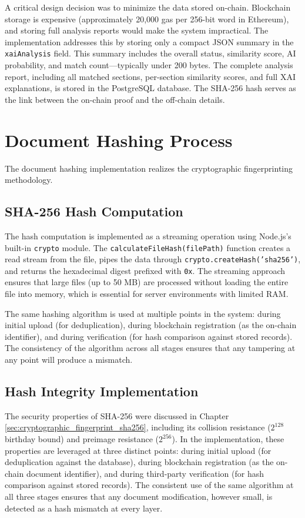 A critical design decision was to minimize the data stored on-chain. Blockchain storage is expensive (approximately 20,000 gas per 256-bit word in Ethereum), and storing full analysis reports would make the system impractical. The implementation addresses this by storing only a compact JSON summary in the \texttt{xaiAnalysis} field. This summary includes the overall status, similarity score, AI probability, and match count---typically under 200 bytes. The complete analysis report, including all matched sections, per-section similarity scores, and full XAI explanations, is stored in the PostgreSQL database. The SHA-256 hash serves as the link between the on-chain proof and the off-chain details.

\section{Document Hashing Process}

The document hashing implementation realizes the cryptographic fingerprinting methodology.

\subsection{SHA-256 Hash Computation}

The hash computation is implemented as a streaming operation using Node.js's built-in \texttt{crypto} module. The \texttt{calculateFileHash(filePath)} function creates a read stream from the file, pipes the data through \texttt{crypto.createHash('sha256')}, and returns the hexadecimal digest prefixed with \texttt{0x}. The streaming approach ensures that large files (up to 50 MB) are processed without loading the entire file into memory, which is essential for server environments with limited RAM.

The same hashing algorithm is used at multiple points in the system: during initial upload (for deduplication), during blockchain registration (as the on-chain identifier), and during verification (for hash comparison against stored records). The consistency of the algorithm across all stages ensures that any tampering at any point will produce a mismatch.

\subsection{Hash Integrity Implementation}

The security properties of SHA-256 were discussed in Chapter \ref{sec:cryptographic_fingerprint_sha256}, including its collision resistance ($2^{128}$ birthday bound) and preimage resistance ($2^{256}$). In the implementation, these properties are leveraged at three distinct points: during initial upload (for deduplication against the database), during blockchain registration (as the on-chain document identifier), and during third-party verification (for hash comparison against stored records). The consistent use of the same algorithm at all three stages ensures that any document modification, however small, is detected as a hash mismatch at every layer.

